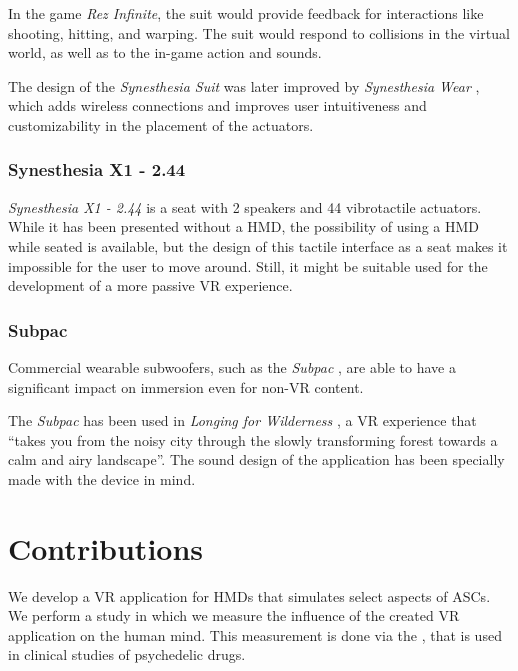 In the game \textit{Rez Infinite}, the suit would provide feedback for interactions like shooting, hitting, and warping. The suit would respond to collisions in the virtual world, as well as to the in-game action and sounds.

The design of the \textit{Synesthesia Suit} was later improved by \textit{Synesthesia Wear} \autocite{furukawa2019synesthesia}, which adds wireless connections and improves user intuitiveness and customizability in the placement of the actuators.

\subsubsection{Synesthesia X1 - 2.44}
\textit{Synesthesia X1 - 2.44} \autocite{synesthesia2021x1} is a seat with 2 speakers and 44 vibrotactile actuators. While it has been presented without a \ac{HMD}, the possibility of using a \ac{HMD} while seated is available, but the design of this tactile interface as a seat makes it impossible for the user to move around. Still, it might be suitable used for the development of a more passive \ac{VR} experience.

\subsubsection{Subpac}
Commercial wearable subwoofers, such as the \textit{Subpac} \autocite{subpac2013subpac}, are able to have a significant impact on immersion \autocite{drempetic2017wearable} even for non-\ac{VR} content.

The \textit{Subpac} has been used in \textit{Longing for Wilderness} \autocite{zimmermann2016longing}, a \ac{VR} experience that ``takes you from the noisy city through the slowly transforming forest towards a calm and airy landscape''. The sound design of the application has been specially made with the device in mind.

\section{Contributions}
We develop a \ac{VR} application for \acp{HMD} that simulates select aspects of \acp{ASC}.
We perform a study in which we measure the influence of the created \ac{VR} application on the human mind. This measurement is done via the , that is used in clinical studies of psychedelic drugs.
